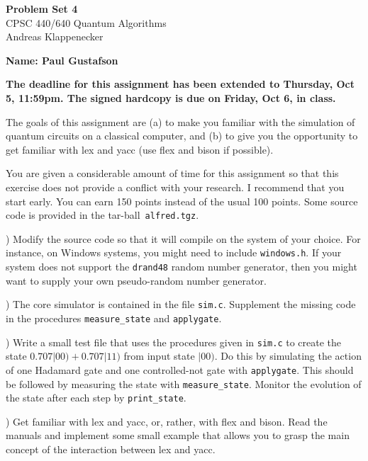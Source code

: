 \documentclass[12pt,a4paper]{article}
\theoremstyle{definition}
\newcommand{\name}[1]{\noindent\textbf{Name: Paul Gustafson} \\}
\newcommand{\honor}{\noindent On my honor, as an Aggie, I have neither
  given nor received any unauthorized aid on any portion of the
  academic work included in this assignment. Furthermore, I have
  disclosed all resources (people, books, web sites, etc.) that have
  been used to prepare this homework. \\[1ex]
 \textbf{Signature:} \underline{\hspace*{5cm}} }
\begin{document}
\thispagestyle{empty}
\begin{center}
\textbf{Problem Set 4}\\
CPSC 440/640 Quantum Algorithms\\ 
Andreas Klappenecker
\end{center}

\name

\honor


\begin{center}
\bf The deadline for this assignment has been extended to Thursday,
Oct 5, 11:59pm. The signed hardcopy is due on Friday, Oct 6, in
class. 
\end{center}


\noindent The goals of this assignment are (a) to make you familiar
with the simulation of quantum circuits on a classical computer, and
(b) to give you the opportunity to get familiar with lex and yacc (use 
flex and bison if possible).

You are given a considerable amount of time for this assignment so
that this exercise does not provide a conflict with your research. I
recommend that you start early. You can earn 150 points instead of the
usual 100 points.  Some source code is provided in the
tar-ball~\texttt{alfred.tgz}.
\medskip

) Modify the source code so that it will compile on the
system of your choice. For instance, on Windows systems, you might
need to include \verb|windows.h|. If your system does not support the
\verb|drand48| random number generator, then you might want to supply
your own pseudo-random number generator. 


) The core simulator is contained in the file \texttt{sim.c}. 
Supplement the missing code in the procedures \texttt{measure\_state}
and \texttt{applygate}. 
\smallskip

) Write a small test file that uses the procedures given in 
\texttt{sim.c} to create the state $0.707|00)+0.707|11)$ from input 
state $|00)$. Do this by simulating the action of one Hadamard gate 
and one controlled-not gate with \texttt{applygate}. This should be 
followed by measuring the state with \texttt{measure\_state}. 
Monitor the evolution of the state after each step by \texttt{print\_state}. 
\smallskip

) Get familiar with lex and yacc, or, rather, with flex 
and bison. Read the manuals and implement some small example that
allows you to grasp the main concept of the interaction between lex
and yacc.
\smallskip
\end{document}
